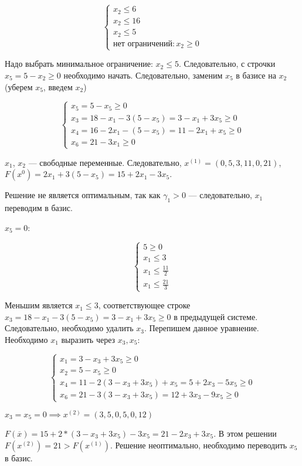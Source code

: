 \documentclass{article}
\begin{document}
$$
\begin{cases}
  x_2 \le 6 \\
  x_2 \le 16 \\
  x_2 \le 5 \\
  \text{нет ограничений}: x_2 \ge 0
\end{cases}
$$

Надо выбрать минимальное ограничение: $x_2 \le 5$. Следовательно, с строчки $x_5 = 5 - x_2 \ge 0$ необходимо начать. Следовательно, заменим $x_5$ в базисе на $x_2$ (уберем $x_5$, введем $x_2$)

$$
\begin{cases}
    x_5 = 5 - x_5 \ge 0 \\
    x_3 = 18 - x_1 - 3 (5 - x_5) = 3 - x_1 + 3x_5 \ge 0\\
    x_4 = 16 - 2x_1 - (5 - x_5) = 11 - 2x_1 + x_5 \ge 0\\
    x_6 = 21 - 3x_1 \ge 0
\end{cases}
$$

$x_1$, $x_2$ — свободные переменные. Следовательно, $x^{(1)} = (0,5,3,11,0,21)$, $F(x^{0}) = 2x_1 + 3 (5 - x_5) = 15 + 2x_1 - 3x_5$.

Решение не является оптимальным, так как $\gamma_1 > 0$ — следовательно, $x_1$ переводим в базис.

$x_5 = 0$:

$$
\begin{cases}
    5 \ge 0 \\
    x_1 \le 3 \\
    x_1 \le \frac{11}{2} \\
    x_1 \le \frac{21}{3}  
\end{cases}
$$

Меньшим является $x_{1} \le 3$, соответствующее строке $x_3 = 18 - x_1 - 3 (5 - x_5) = 3 - x_1 + 3x_5 \ge 0$ в предыдущей системе. Следовательно, необходимо удалить $x_3$. Перепишем данное уравнение. Необходимо $x_1$ выразить через $x_3, x_5$:

$$\begin{cases}
    x_1 = 3 - x_3 + 3x_5 \ge 0 \\
    x_2 = 5 - x_5 \ge 0 \\
    x_4 = 11 - 2 (3 - x_3 + 3x_5) + x_5 = 5 + 2x_3 - 5x_5 \ge 0\\
    x_6 = 21 - 3 (3 - x_3 + 3x_5) = 12 + 3x_3 - 9x_5 \ge 0
\end{cases}$$

$x_3 = x_5 = 0 \implies x^{(2)} = (3,5,0,5,0,12)$

$F(\overline{x}) = 15 + 2 * (3 - x_3 + 3x_5) - 3x_5 = 21 - 2x_3 + 3x_5$. В этом решении $F(x^{(2)}) = 21 > F(x^{(1)})$. Решение неоптимально, необходимо переводить $x_5$ в базис.
\end{document}
